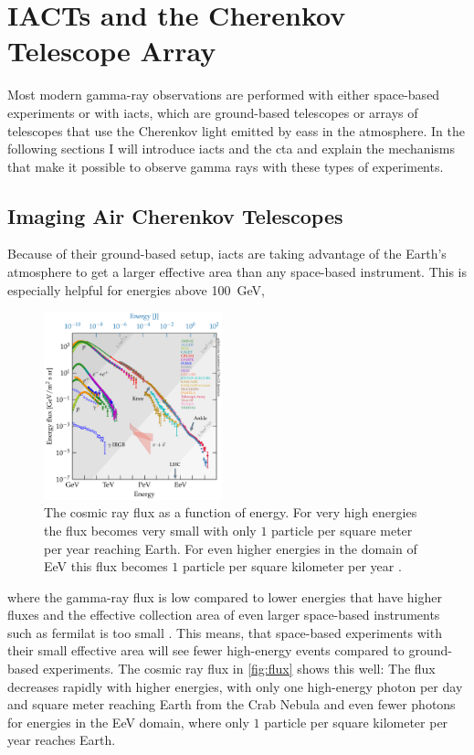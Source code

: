 \chapter{IACTs and the Cherenkov Telescope Array}

Most modern gamma-ray observations are performed with either space-based experiments or with
\glspl{iact}, which are ground-based telescopes or arrays of telescopes that use the Cherenkov light
emitted by \glspl{eas} in the atmosphere. In the following sections I will introduce \glspl{iact} and
the \gls{cta} and explain the mechanisms that make it possible to observe gamma rays with these types
of experiments.


\section{Imaging Air Cherenkov Telescopes}
\label{sec:iact}

Because of their ground-based setup, \glspl{iact} are taking advantage of the Earth's atmosphere to get a
larger effective area than any space-based instrument. This is especially helpful for energies above
\SI{100}{\giga\eV},
\begin{figure}
    \centering
    \vspace*{-0.5cm}
    \includegraphics[width=0.46\textwidth]{graphics/cr_spectrum.pdf}
    \caption{The cosmic ray flux as a function of energy. For very high energies the flux becomes very
    small with only \(\num{1}\) particle per square meter per year reaching Earth. For even higher
    energies in the domain of \si{\exa\eV} this flux becomes \(\num{1}\) particle per square
    kilometer per year \cite{carmelo_2020}.}
    \label{fig:flux}
\end{figure}
where the gamma-ray flux is low compared to lower energies that have higher fluxes and the effective
collection area of even larger space-based instruments such as \gls{fermilat} is too small \cite[p.~256]{funk}.
This means, that space-based experiments with their small effective area
will see fewer high-energy events compared to ground-based experiments. The cosmic ray flux in
\autoref{fig:flux} shows this well: The flux decreases rapidly with higher energies, with only one
high-energy photon per day and square meter reaching Earth from the Crab Nebula \cite{noethe_thesis}
and even fewer photons for energies in the \si{\exa\eV} domain, where only \(\num{1}\) particle per
square kilometer per year reaches Earth.

